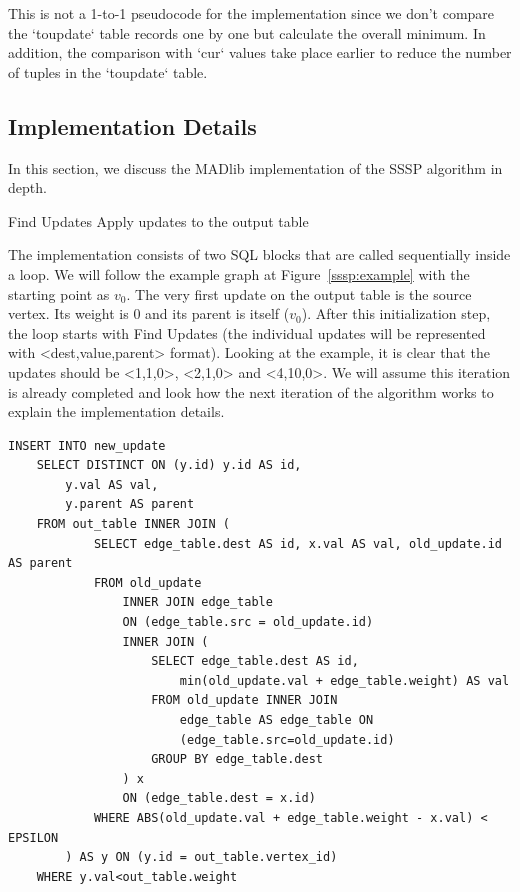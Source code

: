 This is not a 1-to-1 pseudocode for the implementation since we don't compare the `toupdate` table records one by one but calculate the overall minimum. In addition, the comparison with `cur` values take place earlier to reduce the number of tuples in the `toupdate` table.

\subsection{Implementation Details}

In this section, we discuss the MADlib implementation of the SSSP algorithm in depth.

\begin{algorithm} \label{alg:sssp:high}
\begin{algorithmic}[1]
	\Repeat
		\State Find Updates
		\State Apply updates to the output table
\end{algorithmic}
\end{algorithm}

The implementation consists of two SQL blocks that are called sequentially inside a loop. We will follow the example graph at Figure~\ref{sssp:example} with the starting point as $v_0$. The very first update on the output table is the source vertex. Its weight is $0$ and its parent is itself ($v_0$). After this initialization step, the loop starts with Find Updates (the individual updates will be represented with <dest,value,parent> format). Looking at the example, it is clear that the updates should be <1,1,0>, <2,1,0> and <4,10,0>. We will assume this iteration is already completed and look how the next iteration of the algorithm works to explain the implementation details.

\begin{algorithm}
\label{alg:sssp:findu}
\begin{lstlisting}
INSERT INTO new_update
	SELECT DISTINCT ON (y.id) y.id AS id,
		y.val AS val,
		y.parent AS parent
	FROM out_table INNER JOIN (
			SELECT edge_table.dest AS id, x.val AS val, old_update.id AS parent
			FROM old_update
				INNER JOIN edge_table
				ON (edge_table.src = old_update.id)
				INNER JOIN (
					SELECT edge_table.dest AS id,
						min(old_update.val + edge_table.weight) AS val
					FROM old_update INNER JOIN
						edge_table AS edge_table ON
						(edge_table.src=old_update.id)
					GROUP BY edge_table.dest
				) x
				ON (edge_table.dest = x.id)
			WHERE ABS(old_update.val + edge_table.weight - x.val) < EPSILON
		) AS y ON (y.id = out_table.vertex_id)
	WHERE y.val<out_table.weight
\end{lstlisting}
\end{algorithm}

